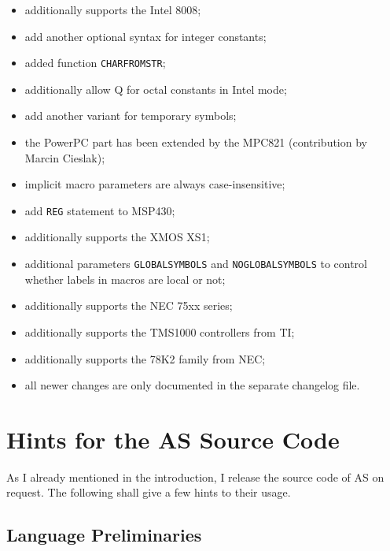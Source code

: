 \documentclass[12pt,twoside]{report}
\newcommand{\tty}[1]{{\tt #1}}
\newcommand{\asname}{{AS}}
\begin{document}
\begin{itemize}
{\begin{itemize}
      \item{additionally supports the Intel 8008;}
      \item{add another optional syntax for integer constants;}
      \item{added function \tty{CHARFROMSTR};}
      \item{additionally allow Q for octal constants in Intel mode;}
      \item{add another variant for temporary symbols;}
      \item{the PowerPC part has been extended by the MPC821
            (contribution by Marcin Cieslak);}
      \item{implicit macro parameters are always case-insensitive;}
      \item{add \tty{REG} statement to MSP430;}
      \item{additionally supports the XMOS XS1;}
      \item{additional parameters \tty{GLOBALSYMBOLS} and
            \tty{NOGLOBALSYMBOLS} to control whether labels in
            macros are local or not;}
      \item{additionally supports the NEC 75xx series;}
      \item{additionally supports the TMS1000 controllers from
            TI;}
      \item{additionally supports the 78K2 family from NEC;}
      \item{all newer changes are only documented in the separate
            changelog file.}
      \end{itemize}}
\end{itemize}


\cleardoublepage
\chapter{Hints for the \asname{} Source Code}
\label{ChapSource}

As I already mentioned in the introduction, I release the source code of
\asname{} on request.  The following shall give a few hints to their usage.


\section{Language Preliminaries}
\end{document}
